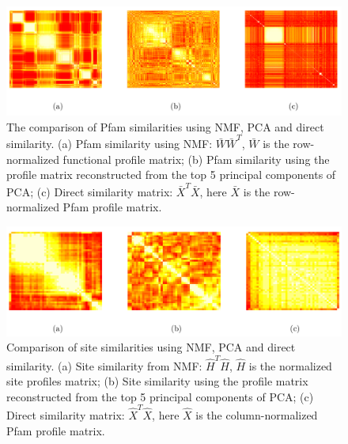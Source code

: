\begin{figure}[!ht]
\centering
\includegraphics[width=\textwidth]{NMF/figures/figS2}
 \caption{The comparison of Pfam similarities using NMF, PCA and direct similarity. (a) Pfam similarity using NMF: $ \bar W \bar W^{T}$, $\bar W$ is the row-normalized functional profile matrix; (b) Pfam similarity using the profile matrix reconstructed from the top 5 principal components of PCA; (c) Direct similarity matrix: $\bar X^{T} \bar X$, here $\bar X$ is the row-normalized Pfam profile matrix.}
 \label{PfamSimilarity}
\end{figure}


\begin{figure}[!ht]
\centering
 \includegraphics[width=\textwidth]{NMF/figures/figS3}
 \caption{Comparison of site similarities using NMF, PCA and direct similarity. (a) Site similarity from NMF: $ \hat H^{T} \hat H$, $\hat H$ is the normalized site profiles matrix; (b) Site similarity using the profile matrix reconstructed from the top 5 principal components of PCA; (c) Direct similarity matrix: $\hat X^{T} \hat X$, here $\hat X$ is the column-normalized Pfam profile matrix. }
 \label{SimilarityCompare}
\end{figure}


